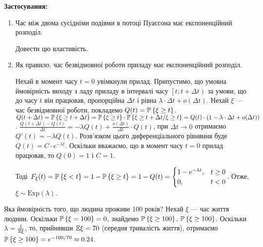 \noindent\textbf{Застосування:}
\begin{enumerate}
    \item Час між двома сусідніми подіями в потоці Пуассона має експоненційний розподіл.
    \begin{exercise}
        Довести цю властивість.
    \end{exercise}
    \item Як правило, час безвідмовної роботи приладу має експоненційний розподіл.
    
    Нехай в момент часу $t=0$ увімкнули прилад. Припустимо, що умовна ймовірність виходу з ладу
    приладу в інтервалі часу $\left[ t; t+\Delta t\right)$ за умови, що до часу $t$ він працював,
    пропорційна $\Delta t$ і рівна $\lambda\cdot \Delta t + o(\Delta t)$. Нехай $\xi$ --- час безвідмовної роботи,
    покладемо $Q(t) = \P\left\{\xi \geq t\right\}$.
    $Q(t+\Delta t) = \P\left\{\xi \geq t + \Delta t\right\} = \P\left\{\xi \geq t\right\} \cdot \P\left\{\xi \geq t+\Delta t / \xi \geq t\right\} = 
    Q(t) \cdot (1 - \lambda\cdot \Delta t + o(\Delta t))$.
    $\frac{Q(t+\Delta t) - Q(t)}{\Delta t} = -\lambda Q(t) + \frac{o(\Delta t)}{\Delta t} \cdot Q(t)$,
    при $\Delta t \rightarrow 0$ отримаємо $Q'(t) = -\lambda Q(t)$.
    Розв'язком цього диференціального рівняння буде $Q(t) = C\cdot e^{-\lambda t}$.
    Оскільки вважаємо, що в момент часу $t=0$ прилад працював, то $Q(0) = 1$ і $C=1$.

    Тоді $F_\xi(t) = \P\left\{ \xi < t\right\} = 1 - \P\left\{ \xi \geq t\right\} = 1 - Q(t) = \begin{cases}
        1 - e^{-\lambda t}, & t \geq 0 \\
        0, & t < 0
    \end{cases}$. Отже, $\xi \sim \mathrm{Exp}(\lambda)$.
\end{enumerate}

\begin{example}
    Яка ймовірність того, що людина проживе 100 років? Нехай $\xi$ --- час життя людини.
    Оскільки $\P\left\{\xi = 100\right\} = 0$, знайдемо $\P\left\{ \xi \geq 100\right\}$.
    $\P\left\{ \xi \geq 100\right\}$.
    Оскільки $\lambda = \frac{1}{\E\xi}$, то, прийнявши $\E\xi = 70$ (середня тривалість життя),
    отримаємо $\P\left\{ \xi \geq 100\right\} = e^{-100/70} \approx 0.24$.
\end{example}

